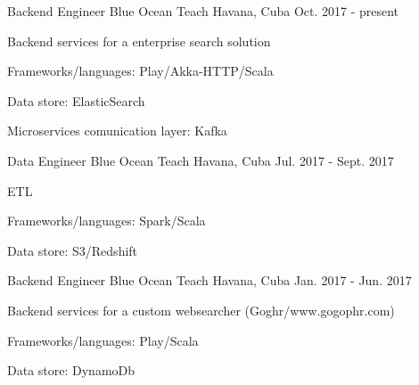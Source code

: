 


\begin{cventries}


\cventry
{Backend Engineer} %
{Blue Ocean Teach} %
{Havana, Cuba} %
{Oct. 2017 - present} %
{ %
\begin{cvitems}
  \item {Backend services for a enterprise search solution}
  \item {Frameworks/languages: Play/Akka-HTTP/Scala}
  \item {Data store: ElasticSearch}
  \item {Microservices comunication layer: Kafka}
\end{cvitems}
}



\cventry
{Data Engineer} %
{Blue Ocean Teach} %
{Havana, Cuba} %
{Jul. 2017 - Sept. 2017} %
{ %
\begin{cvitems}
  \item {ETL}
  \item {Frameworks/languages: Spark/Scala}
  \item {Data store: S3/Redshift}
\end{cvitems}
}



\cventry
{Backend Engineer} %
{Blue Ocean Teach} %
{Havana, Cuba} %
{Jan. 2017 - Jun. 2017} %
{ %
\begin{cvitems}
  \item {Backend services for a custom websearcher (Goghr/www.gogophr.com)}
  \item {Frameworks/languages: Play/Scala}
  \item {Data store: DynamoDb}
\end{cvitems}
}


\end{cventries}
